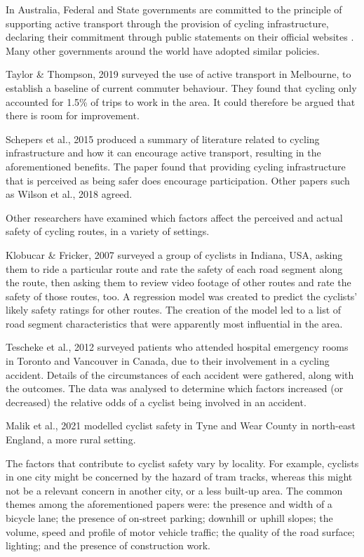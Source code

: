 \documentclass[11pt,twoside]{report}
\begin{document}
In Australia, Federal and State governments are committed to the principle of supporting active transport through the provision of cycling infrastructure, declaring their commitment through public statements on their official websites \cite{federal_policy_2019} \cite{state_policy_2020}.  Many other governments around the world have adopted similar policies.

Taylor \& Thompson, 2019 \cite{melbactive} surveyed the use of active transport in Melbourne, to establish a baseline of current commuter behaviour.  They found that cycling only accounted for 1.5\% of trips to work in the area.  It could therefore be argued that there is room for improvement.

Schepers et al., 2015 \cite{SCHEPERS2015460} produced a summary of literature related to cycling infrastructure and how it can encourage active transport, resulting in the aforementioned benefits.  The paper found that providing cycling infrastructure that is perceived as being safer does encourage participation.  Other papers such as Wilson et al., 2018 \cite{WILSON2018234} agreed.

Other researchers have examined which factors affect the perceived and actual safety of cycling routes, in a variety of settings.

Klobucar \& Fricker, 2007 \cite{BIKESAFETY} surveyed a group of cyclists in Indiana, USA, asking them to ride a particular route and rate the safety of each road segment along the route, then asking them to review video footage of other routes and rate the safety of those routes, too.  A regression model was created to predict the cyclists' likely safety ratings for other routes.  The creation of the model led to a list of road segment characteristics that were apparently most influential in the area.

Tescheke et al., 2012 \cite{Teschke2012} surveyed patients who attended hospital emergency rooms in Toronto and Vancouver in Canada, due to their involvement in a cycling accident.  Details of the circumstances of each accident were gathered, along with the outcomes.  The data was analysed to determine which factors increased (or decreased) the relative odds of a cyclist being involved in an accident.

Malik et al., 2021 \cite{Malik2021} modelled cyclist safety in Tyne and Wear County in north-east England, a more rural setting.

The factors that contribute to cyclist safety vary by locality.  For example, cyclists in one city might be concerned by the hazard of tram tracks, whereas this might not be a relevant concern in another city, or a less built-up area.  The common themes among the aforementioned papers were: the presence and width of a bicycle lane; the presence of on-street parking; downhill or uphill slopes; the volume, speed and profile of motor vehicle traffic; the quality of the road surface; lighting; and the presence of construction work.
\end{document}
